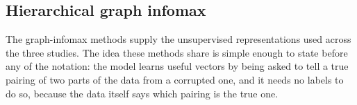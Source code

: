 \subsection{Hierarchical graph infomax}

The graph-infomax methods supply the unsupervised representations used across the
three studies. The idea these methods share is simple enough to state before any of
the notation: the model learns useful vectors by being asked to tell a true pairing of
two parts of the data from a corrupted one, and it needs no labels to do so, because
the data itself says which pairing is the true one.

